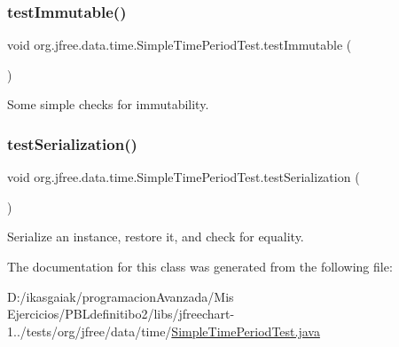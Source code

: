 \subsubsection{\texorpdfstring{test\+Immutable()}{testImmutable()}}
{\footnotesize\ttfamily void org.\+jfree.\+data.\+time.\+Simple\+Time\+Period\+Test.\+test\+Immutable (\begin{DoxyParamCaption}{ }\end{DoxyParamCaption})}

Some simple checks for immutability. \mbox{\label{classorg_1_1jfree_1_1data_1_1time_1_1_simple_time_period_test_a68647581c8b3c2e385d633ddafb526bc}} 
\subsubsection{\texorpdfstring{test\+Serialization()}{testSerialization()}}
{\footnotesize\ttfamily void org.\+jfree.\+data.\+time.\+Simple\+Time\+Period\+Test.\+test\+Serialization (\begin{DoxyParamCaption}{ }\end{DoxyParamCaption})}

Serialize an instance, restore it, and check for equality. 

The documentation for this class was generated from the following file\+:\begin{DoxyCompactItemize}
\item 
D\+:/ikasgaiak/programacion\+Avanzada/\+Mis Ejercicios/\+P\+B\+Ldefinitibo2/libs/jfreechart-\/1../tests/org/jfree/data/time/\mbox{\hyperlink{_simple_time_period_test_8java}{Simple\+Time\+Period\+Test.\+java}}\end{DoxyCompactItemize}
